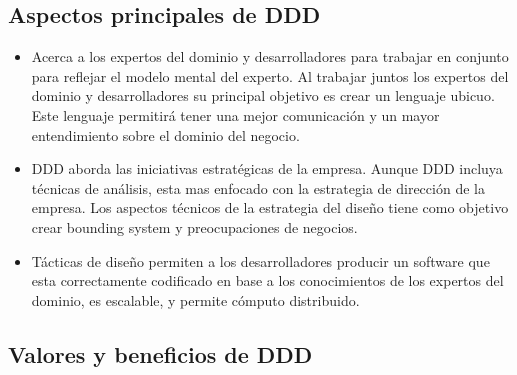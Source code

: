 \documentclass[12pt,twoside]{reedthesis}
\begin{document}
\hypertarget{aspectos-principales-de-ddd}{%
\subsection{Aspectos principales de DDD}\label{aspectos-principales-de-ddd}}
\begin{itemize}
\item
  Acerca a los expertos del dominio y desarrolladores para trabajar en conjunto para reflejar el modelo mental del experto. Al trabajar juntos los expertos del dominio y desarrolladores su principal objetivo es crear un lenguaje ubicuo. Este lenguaje permitirá tener una mejor comunicación y un mayor entendimiento sobre el dominio del negocio.
\item
  DDD aborda las iniciativas estratégicas de la empresa. Aunque DDD incluya técnicas de análisis, esta mas enfocado con la estrategia de dirección de la empresa. Los aspectos técnicos de la estrategia del diseño tiene como objetivo crear bounding system y preocupaciones de negocios.
\item
  Tácticas de diseño permiten a los desarrolladores producir un software que esta correctamente codificado en base a los conocimientos de los expertos del dominio, es escalable, y permite cómputo distribuido.
\end{itemize}
\hypertarget{valores-y-beneficios-de-ddd}{%
\subsection{Valores y beneficios de DDD}\label{valores-y-beneficios-de-ddd}}
\end{document}
